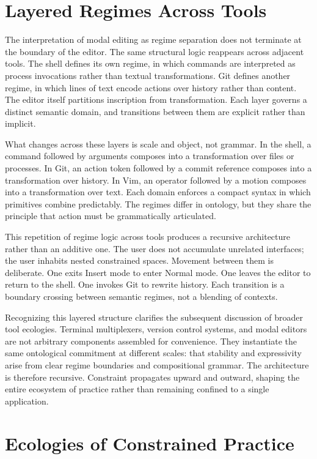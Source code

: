 \documentclass[12pt]{article}
\begin{document}
\section{Layered Regimes Across Tools}

The interpretation of modal editing as regime separation does not terminate at the boundary of the editor. The same structural logic reappears across adjacent tools. The shell defines its own regime, in which commands are interpreted as process invocations rather than textual transformations. Git defines another regime, in which lines of text encode actions over history rather than content. The editor itself partitions inscription from transformation. Each layer governs a distinct semantic domain, and transitions between them are explicit rather than implicit.

What changes across these layers is scale and object, not grammar. In the shell, a command followed by arguments composes into a transformation over files or processes. In Git, an action token followed by a commit reference composes into a transformation over history. In Vim, an operator followed by a motion composes into a transformation over text. Each domain enforces a compact syntax in which primitives combine predictably. The regimes differ in ontology, but they share the principle that action must be grammatically articulated.

This repetition of regime logic across tools produces a recursive architecture rather than an additive one. The user does not accumulate unrelated interfaces; the user inhabits nested constrained spaces. Movement between them is deliberate. One exits Insert mode to enter Normal mode. One leaves the editor to return to the shell. One invokes Git to rewrite history. Each transition is a boundary crossing between semantic regimes, not a blending of contexts.

Recognizing this layered structure clarifies the subsequent discussion of broader tool ecologies. Terminal multiplexers, version control systems, and modal editors are not arbitrary components assembled for convenience. They instantiate the same ontological commitment at different scales: that stability and expressivity arise from clear regime boundaries and compositional grammar. The architecture is therefore recursive. Constraint propagates upward and outward, shaping the entire ecosystem of practice rather than remaining confined to a single application.

\section{Ecologies of Constrained Practice}
\end{document}
